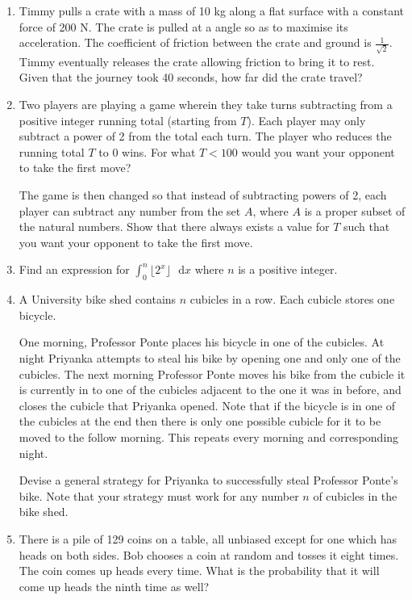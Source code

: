 \documentclass{article}
\begin{document}
\begin{enumerate}
    \item
    Timmy pulls a crate with a mass of 10 kg along a flat surface with a constant force of 200 N. The crate is pulled at a angle so as to maximise its acceleration. The coefficient of friction between the crate and ground is $\frac{1}{\sqrt{2}}$. Timmy eventually releases the crate allowing friction to bring it to rest. Given that the journey took 40 seconds, how far did the crate travel?
    
    \item
    Two players are playing a game wherein they take turns subtracting from a positive integer running total (starting from $T$). Each player may only subtract a power of 2 from the total each turn. The player who reduces the running total $T$ to 0 wins. For what $T<100$ would you want your opponent to take the first move?
    
    The game is then changed so that instead of subtracting powers of 2, each player can subtract any number from the set $A$, where $A$ is a proper subset of the natural numbers. Show that there always exists a value for $T$ such that you want your opponent to take the first move.
    
    \item
    Find an expression for $\int_0^n \lfloor 2^x \rfloor \text{ } \mathrm{d}x$ where $n$ is a positive integer.
    
    \item
    A University bike shed contains $n$ cubicles in a row. Each cubicle stores one bicycle. 
    
    One morning, Professor Ponte places his bicycle in one of the cubicles. At night Priyanka attempts to steal his bike by opening one and only one of the cubicles. The next morning Professor Ponte moves his bike from the cubicle it is currently in to one of the cubicles adjacent to the one it was in before, and closes the cubicle that Priyanka opened. Note that if the bicycle is in one of the cubicles at the end then there is only one possible cubicle for it to be moved to the follow morning. This repeats every morning and corresponding night.
    
    Devise a general strategy for Priyanka to successfully steal Professor Ponte's bike. Note that your strategy must work for any number $n$ of cubicles in the bike shed.
    
    \item
    There is a pile of 129 coins on a table, all unbiased except for one which has heads on both sides. Bob chooses a coin at random and tosses it eight times. The coin comes up heads every time. What is the probability that it will come up heads the ninth time as well?
    

\end{enumerate}
\end{document}

